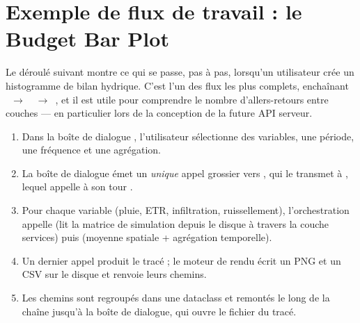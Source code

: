 
\section{Exemple de flux de travail : le Budget Bar Plot}
\label{sec-example-workflow}

Le déroulé suivant montre ce qui se passe, pas à pas, lorsqu'un utilisateur crée un histogramme de bilan hydrique. C'est l'un des flux les plus complets, enchaînant ~$\rightarrow$~~$\rightarrow$~, et il est utile pour comprendre le nombre d'allers-retours entre couches --- en particulier lors de la conception de la future API serveur.

\begin{enumerate}
    \item Dans la boîte de dialogue , l'utilisateur sélectionne des variables, une période, une fréquence et une agrégation.
    \item La boîte de dialogue émet un \emph{unique} appel grossier vers , qui le transmet à , lequel appelle à son tour .
    \item Pour chaque variable (pluie, ETR, infiltration, ruissellement), l'orchestration appelle  (lit la matrice de simulation depuis le disque à travers la couche services) puis  (moyenne spatiale + agrégation temporelle).
    \item Un dernier appel  produit le tracé ; le moteur de rendu écrit un PNG et un CSV sur le disque et renvoie leurs chemins.
    \item Les chemins sont regroupés dans une dataclass  et remontés le long de la chaîne jusqu'à la boîte de dialogue, qui ouvre le fichier du tracé.
\end{enumerate}

